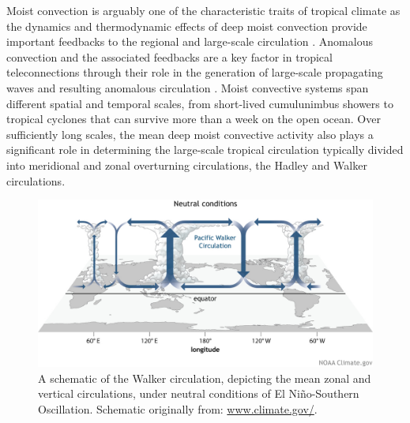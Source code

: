 
 Moist convection is arguably one of the characteristic traits of tropical climate as the dynamics and thermodynamic effects of deep moist convection provide important feedbacks to the regional and large-scale circulation \citep{emanuel1994atmospheric,webster2020dynamics}. 
 Anomalous convection and the associated feedbacks are a key factor in tropical teleconnections through their role in the generation of large-scale propagating waves and resulting anomalous circulation \citep{hartmann2015,li2018fundamentals}.
 Moist convective systems span different spatial and temporal scales, from short-lived cumulunimbus showers to tropical cyclones that can survive more than a week on the open ocean. Over sufficiently long scales, the mean deep moist convective activity also plays a significant role in determining the large-scale tropical circulation typically divided into meridional and zonal overturning circulations, the Hadley and Walker circulations.
 
\begin{figure}[t!]
\includegraphics[width=\linewidth]{figures/Walker_Neutral_large.jpg}
\caption[The Walker circulation]{A schematic of the Walker circulation, depicting the mean zonal and vertical circulations, under neutral conditions of El Niño-Southern Oscillation. Schematic originally from: \url{www.climate.gov/}. }
\label{fig:walker_schematic}
\end{figure}
 
